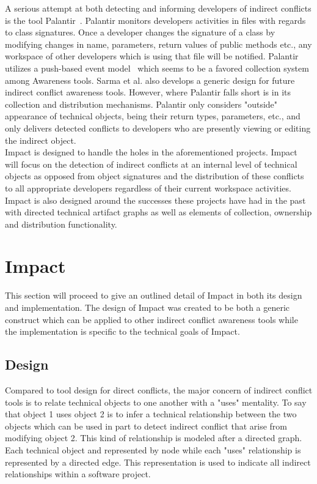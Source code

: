 \documentclass[conference]{IEEEtran}
\begin{document}
A serious attempt at both detecting and informing developers of
indirect conflicts is the tool Palantir~\cite{Sarma:2007:TSA}. Palantir
monitors developers activities in files with regards to class signatures.
Once a developer changes the signature of a class by modifying changes
in name, parameters, return values of public methods etc., any workspace
of other developers which is using that file will be notified. Palantir utilizes
a push-based event model~\cite{Fitzpatrick:2002:SPA} which seems to be
a favored collection system among Awareness tools. Sarma et al. also
develops a generic design for future indirect conflict awareness tools. 
However, where Palantir falls short is in its collection and distribution
mechanisms. Palantir only considers "outside" appearance of technical
objects, being their return types, parameters, etc., and only delivers
detected conflicts to developers who are presently viewing or editing
the indirect object.\\

Impact is designed to handle the holes in the aforementioned projects.
Impact will focus on the detection of indirect conflicts at an internal level
of technical objects as opposed from object signatures and the distribution
of these conflicts to all appropriate developers regardless of their current
workspace activities. Impact is also designed around the successes these
projects have had in the past with directed technical artifact graphs as 
well as elements of collection, ownership and distribution functionality.\\


\section{Impact}
This section will proceed to give an outlined detail of Impact in both its
design and implementation. The design of Impact was created to be both
a generic construct which can be applied to other indirect conflict 
awareness tools while the implementation is specific to the technical
goals of Impact.

\subsection{Design}
Compared to tool design for direct conflicts, the major concern of 
indirect conflict tools is to relate technical objects to one another
with a "uses" mentality. To say that object 1 uses object 2 is to infer
a technical relationship between the two objects which can be used
in part to detect indirect conflict that arise from modifying object
2. This kind of relationship is modeled after a directed graph. Each
technical object and represented by node while each "uses"
relationship is represented by a directed edge. This representation
is used to indicate all indirect relationships within a software project.\\
\end{document}

